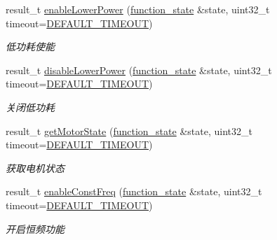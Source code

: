 \begin{DoxyCompactItemize}
\begin{DoxyCompactList}
\end{DoxyCompactList}\item 
result\+\_\+t \hyperlink{classydlidar_1_1_y_dlidar_driver_a85a9af2aff7201a42f000299990b0ce5}{enable\+Lower\+Power} (\hyperlink{structfunction__state}{function\+\_\+state} \&state, uint32\+\_\+t timeout=\hyperlink{classydlidar_1_1_y_dlidar_driver_a13a4f2dc4067b43794b2c47c06d5d27aa07c79ce96f468ff4b40495ef84584442}{D\+E\+F\+A\+U\+L\+T\+\_\+\+T\+I\+M\+E\+O\+UT})
\begin{DoxyCompactList}\small\item\em 低功耗使能 ~\newline
\end{DoxyCompactList}\item 
result\+\_\+t \hyperlink{classydlidar_1_1_y_dlidar_driver_a18895e94f42ce61890b4912727cdfbd8}{disable\+Lower\+Power} (\hyperlink{structfunction__state}{function\+\_\+state} \&state, uint32\+\_\+t timeout=\hyperlink{classydlidar_1_1_y_dlidar_driver_a13a4f2dc4067b43794b2c47c06d5d27aa07c79ce96f468ff4b40495ef84584442}{D\+E\+F\+A\+U\+L\+T\+\_\+\+T\+I\+M\+E\+O\+UT})
\begin{DoxyCompactList}\small\item\em 关闭低功耗 ~\newline
\end{DoxyCompactList}\item 
result\+\_\+t \hyperlink{classydlidar_1_1_y_dlidar_driver_af5d460ababe4b8a34b02d33268f24d4d}{get\+Motor\+State} (\hyperlink{structfunction__state}{function\+\_\+state} \&state, uint32\+\_\+t timeout=\hyperlink{classydlidar_1_1_y_dlidar_driver_a13a4f2dc4067b43794b2c47c06d5d27aa07c79ce96f468ff4b40495ef84584442}{D\+E\+F\+A\+U\+L\+T\+\_\+\+T\+I\+M\+E\+O\+UT})
\begin{DoxyCompactList}\small\item\em 获取电机状态 ~\newline
\end{DoxyCompactList}\item 
result\+\_\+t \hyperlink{classydlidar_1_1_y_dlidar_driver_a1e5c25618be9867dfdb1aa2f5e9cb93c}{enable\+Const\+Freq} (\hyperlink{structfunction__state}{function\+\_\+state} \&state, uint32\+\_\+t timeout=\hyperlink{classydlidar_1_1_y_dlidar_driver_a13a4f2dc4067b43794b2c47c06d5d27aa07c79ce96f468ff4b40495ef84584442}{D\+E\+F\+A\+U\+L\+T\+\_\+\+T\+I\+M\+E\+O\+UT})
\begin{DoxyCompactList}\small\item\em 开启恒频功能 ~\newline
\end{DoxyCompactList}\item 

\end{DoxyCompactItemize}
